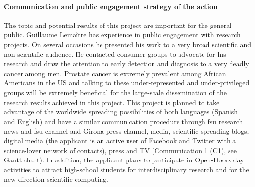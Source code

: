 \paragraph{Communication and public engagement strategy of the action}
The topic and potential results of this project are important for the general public.
Guillaume Lema\^itre has experience in public engagement with research projects.
On several occasions he presented his work to a very broad scientific and non-scientific audience.
He contacted consumer groups to advocate for his research and draw the attention to early detection and diagnosis to a very deadly cancer among men.
Prostate cancer is extremely prevalent among African Americans in the US and talking to these under-represented and under-privileged groups will be extremely beneficial for the large-scale dissemination of the research results achieved in this project.
This project is planned to take advantage of the worldwide spreading possibilities of both languages (Spanish and English) and have a similar communication procedure through \ac{fsu} research news and \ac{fsu} channel and Girona press channel, media, scientific-spreading blogs, digital media (the applicant is an active user of Facebook and Twitter with a science-lover network of contacts), press and TV (Communication 1 (C1), see Gantt chart).
In addition, the applicant plans to participate in Open-Doors day activities to attract high-school students for interdisciplinary research and for the new direction scientific computing.


